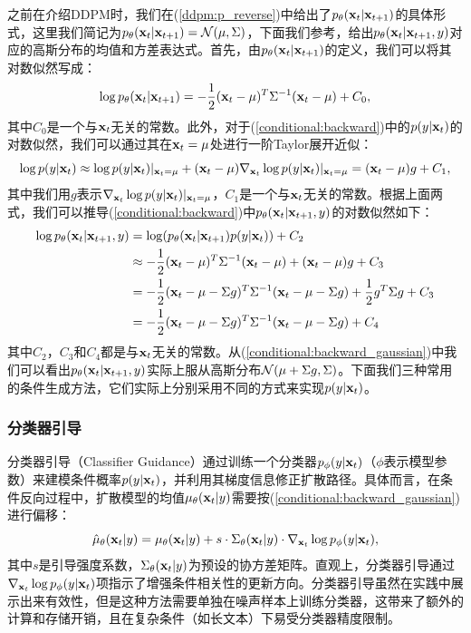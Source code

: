 \documentclass[11pt,a4paper,UTF8]{ctexart}
\begin{document}
之前在介绍DDPM时，我们在(\ref{ddpm:p_reverse})中给出了$p_\theta(\mathbf{x}_{t}|\mathbf{x}_{t+1})$的具体形式，这里我们简记为$p_\theta(\mathbf{x}_{t}|\mathbf{x}_{t+1})=\mathcal{N}(\mu,\Sigma)$，下面我们参考\cite{dhariwal2021diffusion}，给出$p_{\theta}(\mathbf{x}_{t}|\mathbf{x}_{t+1},y)$对应的高斯分布的均值和方差表达式。首先，由$p_{\theta}(\mathbf{x}_{t}|\mathbf{x}_{t+1})$的定义，我们可以将其对数似然写成：
\begin{equation*}
    \log p_{\theta}(\mathbf{x}_{t}|\mathbf{x}_{t+1}) = -\frac{1}{2}(\mathbf{x}_t-\mu)^{T}\Sigma^{-1}(\mathbf{x}_t-\mu) + C_0,
\end{equation*}
其中$C_0$是一个与$\mathbf{x}_t$无关的常数。此外，对于(\ref{conditional:backward})中的$p(y|\mathbf{x}_t)$的对数似然，我们可以通过其在$\mathbf{x}_t=\mu$处进行一阶Taylor展开近似：
\begin{equation*}
    \log p(y|\mathbf{x}_t)\approx \log p(y|\mathbf{x}_t)|_{\mathbf{x}_t=\mu} + (\mathbf{x}_t-\mu)\nabla_{\mathbf{x}_t} \log p(y|\mathbf{x}_t)|_{\mathbf{x}_t=\mu} = (\mathbf{x}_t-\mu)g + C_1,
\end{equation*}
其中我们用$g$表示$\nabla_{\mathbf{x}_t} \log p(y|\mathbf{x}_t)|_{\mathbf{x}_t=\mu}$，$C_1$是一个与$\mathbf{x}_t$无关的常数。根据上面两式，我们可以推导(\ref{conditional:backward})中$p_{\theta}(\mathbf{x}_{t}|\mathbf{x}_{t+1},y)$的对数似然如下：
\begin{align}
\begin{split}
    \log p_{\theta}(\mathbf{x}_{t}|\mathbf{x}_{t+1},y) &= \log(p_\theta(\mathbf{x}_{t}|\mathbf{x}_{t+1})p(y|\mathbf{x}_t)) + C_2 \\
    &\approx -\frac{1}{2}(\mathbf{x}_t-\mu)^{T}\Sigma^{-1}(\mathbf{x}_t-\mu) + (\mathbf{x}_t-\mu)g + C_3 \\
    &= -\frac{1}{2} (\mathbf{x}_t-\mu-\Sigma g)^{T}\Sigma^{-1}(\mathbf{x}_t-\mu-\Sigma g) + \frac{1}{2}g^T\Sigma g + C_3 \\
    &= -\frac{1}{2} (\mathbf{x}_t-\mu-\Sigma g)^{T}\Sigma^{-1}(\mathbf{x}_t-\mu-\Sigma g) + C_4
\end{split}
\label{conditional:backward_gaussian}
\end{align}
其中$C_2$，$C_3$和$C_4$都是与$\mathbf{x}_t$无关的常数。从(\ref{conditional:backward_gaussian})中我们可以看出$p_{\theta}(\mathbf{x}_{t}|\mathbf{x}_{t+1},y)$实际上服从高斯分布$\mathcal{N}(\mu+\Sigma g,\Sigma)$。下面我们三种常用的条件生成方法，它们实际上分别采用不同的方式来实现$p(y|\mathbf{x}_t)$。

\subsubsection{分类器引导}

分类器引导（Classifier Guidance）\cite{dhariwal2021diffusion}通过训练一个分类器$p_{\phi}(y|\mathbf{x}_t)$（$\phi$表示模型参数）来建模条件概率$p(y|\mathbf{x}_t)$，并利用其梯度信息修正扩散路径。具体而言，在条件反向过程中，扩散模型的均值$\mu_\theta(\mathbf{x}_t|y)$需要按(\ref{conditional:backward_gaussian})进行偏移：
\begin{equation}
\hat{\mu}_{\theta}(\mathbf{x}_t|y)=\mu_{\theta}(\mathbf{x}_t|y) + s\cdot\Sigma_\theta(\mathbf{x}_t|y)\cdot\nabla_{\mathbf{x}_t}\log p_{\phi}(y|\mathbf{x}_t),
\label{conditional_classifier_guided}
\end{equation}
其中$s$是引导强度系数，$\Sigma_\theta(\mathbf{x}_t|y)$为预设的协方差矩阵。直观上，分类器引导通过$\nabla_{\mathbf{x}_t}\log p_{\phi}(y|\mathbf{x}_t)$项指示了增强条件相关性的更新方向。分类器引导虽然在实践中展示出来有效性，但是这种方法需要单独在噪声样本上训练分类器，这带来了额外的计算和存储开销，且在复杂条件（如长文本）下易受分类器精度限制。
\end{document}
